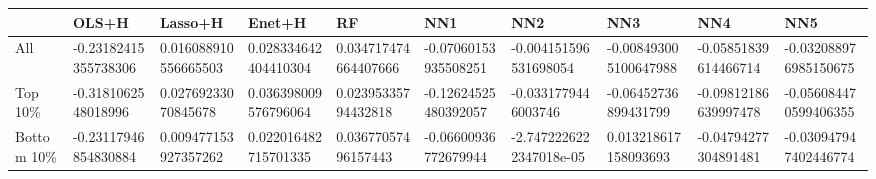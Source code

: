 \begin{tabularx}{\linewidth}{*{9}{X}}
& OLS+H& Lasso+H& Enet+H& RF& NN1& NN2& NN3& NN4& NN5\\
\hline
All& -0.23182415355738306& 0.016088910556665503& 0.028334642404410304& 0.034717474664407666& -0.07060153935508251& -0.004151596531698054& -0.008493005100647988& -0.05851839614466714& -0.032088976985150675\\
\hline
Top 10\%& -0.3181062548018996& 0.02769233070845678& 0.036398009576796064& 0.02395335794432818& -0.12624525480392057& -0.0331779446003746& -0.06452736899431799& -0.09812186639997478& -0.056084470599406355\\
\hline
Bottom 10\%& -0.23117946854830884& 0.009477153927357262& 0.022016482715701335& 0.03677057496157443& -0.06600936772679944& -2.7472226222347018e-05& 0.013218617158093693& -0.04794277304891481& -0.030947947402446774\\
\hline
\end{tabularx}